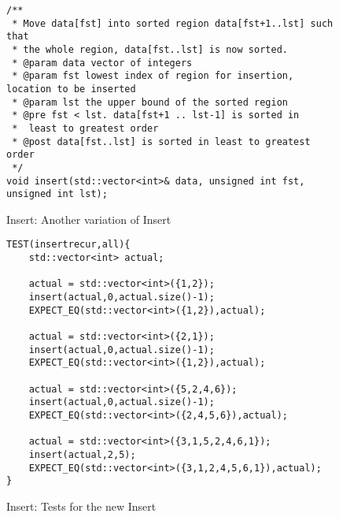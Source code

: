 \documentclass[]{tufte-handout}
\begin{document}
\begin{figure}[!htbp]
\begin{lstlisting}
/**
 * Move data[fst] into sorted region data[fst+1..lst] such that
 * the whole region, data[fst..lst] is now sorted.
 * @param data vector of integers
 * @param fst lowest index of region for insertion, location to be inserted
 * @param lst the upper bound of the sorted region
 * @pre fst < lst. data[fst+1 .. lst-1] is sorted in
 *  least to greatest order
 * @post data[fst..lst] is sorted in least to greatest order
 */
void insert(std::vector<int>& data, unsigned int fst, unsigned int lst);
\end{lstlisting}
\caption{Insert: Another variation of Insert}
\label{code:insertrecdecl}
\end{figure} 

\begin{figure}[!htbp]
\begin{lstlisting}
TEST(insertrecur,all){
    std::vector<int> actual;

    actual = std::vector<int>({1,2});
    insert(actual,0,actual.size()-1);
    EXPECT_EQ(std::vector<int>({1,2}),actual);

    actual = std::vector<int>({2,1});
    insert(actual,0,actual.size()-1);
    EXPECT_EQ(std::vector<int>({1,2}),actual);

    actual = std::vector<int>({5,2,4,6});
	insert(actual,0,actual.size()-1);
    EXPECT_EQ(std::vector<int>({2,4,5,6}),actual);

    actual = std::vector<int>({3,1,5,2,4,6,1});
	insert(actual,2,5);
    EXPECT_EQ(std::vector<int>({3,1,2,4,5,6,1}),actual);
}
\end{lstlisting}
\caption{Insert: Tests for the new Insert}
\label{code:insertrectests}
\end{figure} 
\end{document}
